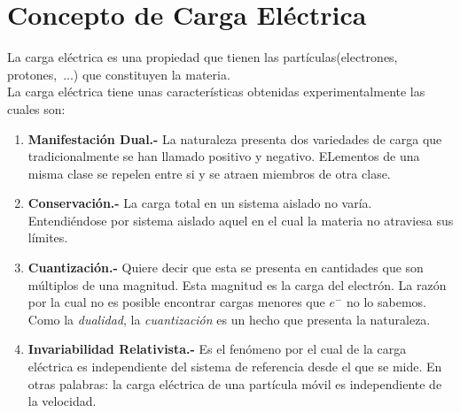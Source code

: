 \documentclass[../main]{subfiles}
\begin{document}
\section{Concepto de Carga Eléctrica}
La carga eléctrica es una propiedad que tienen las partículas(electrones, protones,\ ...) que constituyen la materia. \\
La carga eléctrica tiene unas características obtenidas experimentalmente las cuales son:
\begin{enumerate}
    \item \textbf{Manifestación Dual.-} La naturaleza presenta dos variedades de carga que tradicionalmente se han llamado positivo y negativo. ELementos de una misma clase se repelen entre si y se atraen miembros de otra clase.
    \item \textbf{Conservación.-} La carga total en un sistema aislado no varía. Entendiéndose por sistema aislado aquel en el cual la materia no atraviesa sus límites.
    \item \textbf{Cuantización.-} Quiere decir que esta se presenta en cantidades que son múltiplos de una magnitud. Esta magnitud es la carga del electrón. La razón por la cual no es posible encontrar cargas menores que $e^-$ no lo sabemos. Como la \textit{dualidad}, la \textit{cuantización} es un hecho que presenta la naturaleza.
    \item \textbf{Invariabilidad Relativista.-} Es el fenómeno por el cual de la carga eléctrica es independiente del sistema de referencia desde el que se mide. En otras palabras: la carga eléctrica de una partícula móvil es independiente de la velocidad.
\end{enumerate}
\end{document}
